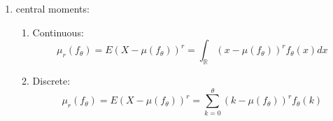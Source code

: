 \begin{enumerate}
    \item central moments:
    \begin{enumerate}
        \item Continuous: 
        \[
            \mu _r ( f_\theta  ) 
            = E(X - \mu ( f_\theta  ))^r 
            = \int_\mathbb{R} (x - \mu ( f_\theta  ))^r f_\theta  (x) dx
        \]

        \item Discrete: 
        \[
            \mu _r ( f_\theta  ) 
            = E(X - \mu ( f_\theta  ))^r 
            = \sum_{k=0}^{\theta} (k - \mu ( f_\theta  ))^r f_\theta  (k)
        \]
    \end{enumerate}

    
\end{enumerate}









































